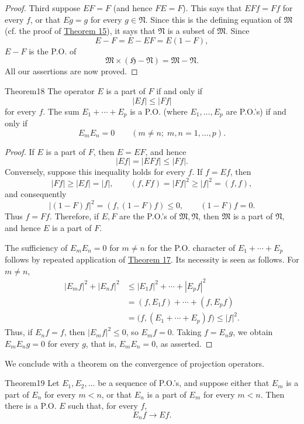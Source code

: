 ﻿\documentclass[paper=b5,fontsize=13pt,bookmarkpackage=false,twoside]{scrartcl}
\begin{document}
\begin{proof}
Third suppose $EF=F$ (and hence $FE=F$). This says that $EFf=Ff$ for every $f$, or that $Eg=g$ for every $g\in\mathfrak N$. Since this is the defining equation of $\mathfrak M$ (cf. the proof of \hyperref[thm:15]{Theorem 15}), it says that $\mathfrak N$ is a subset of $\mathfrak M$. Since
\[
E-F=E-EF=E(1-F),
\]
$E-F$ is the P.O. of
\[
\mathfrak M\times(\mathfrak H-\mathfrak N)=\mathfrak M-\mathfrak N.
\]
All our assertions are now proved.
\end{proof}

\begin{namedstatement}{Theorem}{18}\label{thm:18}
The operator $E$ is a part of $F$ if and only if
\[
|Ef|\le|Ff|
\]
for every $f$. The sum $E_1+\cdots+E_p$ is a P.O. (where $E_1,\ldots,E_p$ are P.O.'s) if and only if
\[
E_mE_n=0\qquad(m\ne n;\;m,n=1,\ldots,p).
\]
\end{namedstatement}

\begin{proof}
If $E$ is a part of $F$, then $E=EF$, and hence
\[
|Ef|=|EFf|\le|Ff|.
\]
Conversely, suppose this inequality holds for every $f$. If $f=Ef$, then
\[
|Ff|\ge|Ef|=|f|,\qquad
(f,Ff)=|Ff|^2\ge|f|^2=(f,f),
\]
and consequently
\[
|(1-F)f|^2=(f,(1-F)f)\le0,\qquad (1-F)f=0.
\]
Thus $f=Ff$. Therefore, if $E,F$ are the P.O.'s of $\mathfrak M,\mathfrak N$, then $\mathfrak M$ is a part of $\mathfrak N$, and hence $E$ is a part of $F$.

The sufficiency of $E_mE_n=0$ for $m\ne n$ for the P.O. character of $E_1+\cdots+E_p$ follows by repeated application of \hyperref[thm:17]{Theorem 17}. Its necessity is seen as follows. For $m\ne n$,
\begin{align*}
|E_mf|^2+|E_nf|^2
 &\le |E_1f|^2+\cdots+|E_pf|^2\\
 &=(f,E_1f)+\cdots+(f,E_pf)\\
 &=\bigl(f,(E_1+\cdots+E_p)f\bigr)\le|f|^2.
\end{align*}
Thus, if $E_nf=f$, then $|E_mf|^2\le0$, so $E_mf=0$. Taking $f=E_ng$, we obtain $E_mE_ng=0$ for every $g$, that is, $E_mE_n=0$, as asserted.
\end{proof}

We conclude with a theorem on the convergence of projection operators.

\begin{namedstatement}{Theorem}{19}\label{thm:19}
Let $E_1,E_2,\ldots$ be a sequence of P.O.'s, and suppose either that $E_m$ is a part of $E_n$ for every $m<n$, or that $E_n$ is a part of $E_m$ for every $m<n$. Then there is a P.O. $E$ such that, for every $f$,
\[
E_nf\longrightarrow Ef.
\]
\end{namedstatement}
\end{document}
